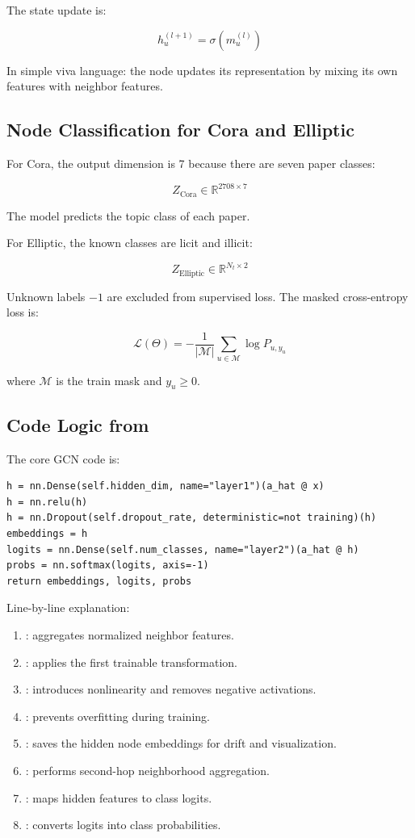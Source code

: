 \documentclass[12pt,a4paper]{article}
\begin{document}
The state update is:

$$
h_u^{(l+1)}=\sigma(m_u^{(l)})
$$

In simple viva language: the node updates its representation by mixing its own features with neighbor features.

\subsection{Node Classification for Cora and Elliptic}
For Cora, the output dimension is 7 because there are seven paper classes:

$$
Z_{\text{Cora}}\in \mathbb{R}^{2708\times 7}
$$

The model predicts the topic class of each paper.

For Elliptic, the known classes are licit and illicit:

$$
Z_{\text{Elliptic}}\in \mathbb{R}^{N_t\times 2}
$$

Unknown labels $-1$ are excluded from supervised loss. The masked cross-entropy loss is:

$$
\mathcal{L}(\Theta)=-\frac{1}{|\mathcal{M}|}\sum_{u\in\mathcal{M}}\log P_{u,y_u}
$$

where $\mathcal{M}$ is the train mask and $y_u\geq 0$.

\subsection{Code Logic from }
The core GCN code is:

\begin{lstlisting}
h = nn.Dense(self.hidden_dim, name="layer1")(a_hat @ x)
h = nn.relu(h)
h = nn.Dropout(self.dropout_rate, deterministic=not training)(h)
embeddings = h
logits = nn.Dense(self.num_classes, name="layer2")(a_hat @ h)
probs = nn.softmax(logits, axis=-1)
return embeddings, logits, probs
\end{lstlisting}

Line-by-line explanation:
\begin{enumerate}
    \item {}: aggregates normalized neighbor features.
    \item {}: applies the first trainable transformation.
    \item {}: introduces nonlinearity and removes negative activations.
    \item {}: prevents overfitting during training.
    \item {}: saves the hidden node embeddings for drift and visualization.
    \item {}: performs second-hop neighborhood aggregation.
    \item {}: maps hidden features to class logits.
    \item {}: converts logits into class probabilities.
\end{enumerate}
\end{document}
